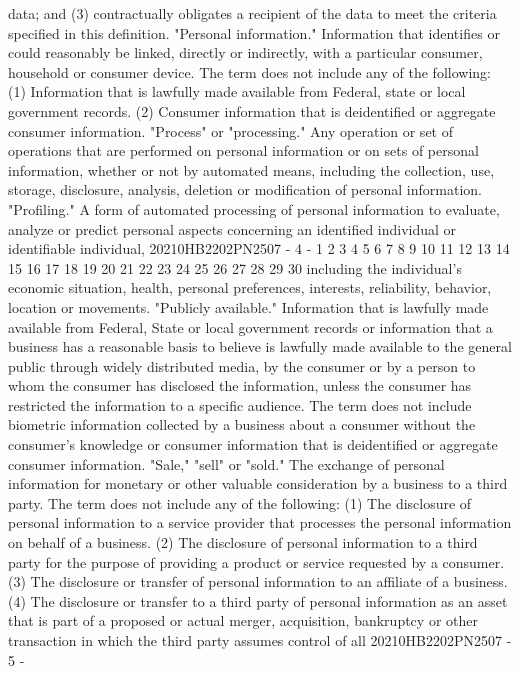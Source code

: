 data; and
(3) contractually obligates a recipient of the data to
meet the criteria specified in this definition.
"Personal information." Information that identifies or could
reasonably be linked, directly or indirectly, with a particular
consumer, household or consumer device. The term does not
include any of the following:
(1) Information that is lawfully made available from
Federal, state or local government records.
(2) Consumer information that is deidentified or
aggregate consumer information.
"Process" or "processing." Any operation or set of
operations that are performed on personal information or on sets
of personal information, whether or not by automated means,
including the collection, use, storage, disclosure, analysis,
deletion or modification of personal information.
"Profiling." A form of automated processing of personal
information to evaluate, analyze or predict personal aspects
concerning an identified individual or identifiable individual,
20210HB2202PN2507 - 4 -
1
2
3
4
5
6
7
8
9
10
11
12
13
14
15
16
17
18
19
20
21
22
23
24
25
26
27
28
29
30
including the individual's economic situation, health, personal
preferences, interests, reliability, behavior, location or
movements.
"Publicly available." Information that is lawfully made
available from Federal, State or local government records or
information that a business has a reasonable basis to believe is
lawfully made available to the general public through widely
distributed media, by the consumer or by a person to whom the
consumer has disclosed the information, unless the consumer has
restricted the information to a specific audience. The term does
not include biometric information collected by a business about
a consumer without the consumer's knowledge or consumer
information that is deidentified or aggregate consumer
information.
"Sale," "sell" or "sold." The exchange of personal
information for monetary or other valuable consideration by a
business to a third party. The term does not include any of the
following:
(1) The disclosure of personal information to a service
provider that processes the personal information on behalf of
a business.
(2) The disclosure of personal information to a third
party for the purpose of providing a product or service
requested by a consumer.
(3) The disclosure or transfer of personal information
to an affiliate of a business.
(4) The disclosure or transfer to a third party of
personal information as an asset that is part of a proposed
or actual merger, acquisition, bankruptcy or other
transaction in which the third party assumes control of all
20210HB2202PN2507 - 5 -
